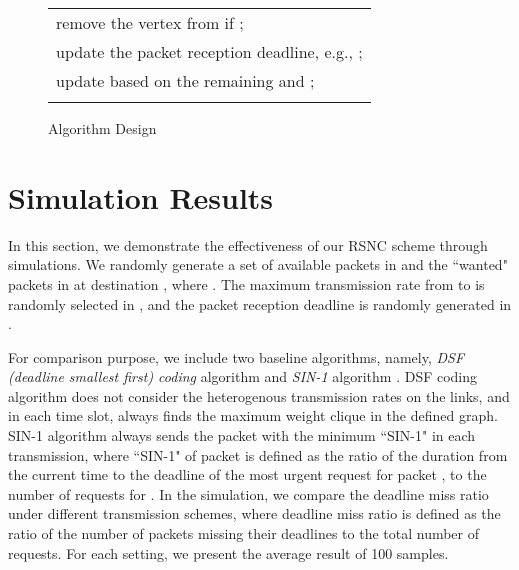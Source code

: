\documentclass[journal]{IEEEtran}
\begin{document}
\begin{figure}[t]
{\begin{tabular}{|l|}
\hspace{4mm} remove the vertex  from  if ;\\
\hspace{4mm} update the packet reception deadline, e.g., ;\\
\hspace{4mm} update  based on the remaining  and ;\\
\hspace{2mm}{\bf Endwhile}\\
\hline
\end{tabular}\vspace{-0.05in}
\caption{Algorithm Design}\vspace{-0.15in} \label{alg}}
\end{figure}

\vspace{-0.1in}
\section{Simulation Results}\label{Sec.simulation}\vspace{-0.02in}
In this section, we demonstrate the effectiveness of our RSNC scheme through simulations.
We randomly generate a set of available packets in  and the ``wanted" packets in  at destination , where . The maximum transmission rate from  to  is randomly selected in , and the packet reception deadline is randomly generated in .

For comparison purpose, we include two baseline algorithms,
namely, {\em DSF (deadline smallest first) coding} algorithm \cite{ZX2010Broadcast6} and {\em SIN-1} algorithm \cite{XTL2006Time-critical14}. DSF coding algorithm does not consider the heterogenous transmission rates on the links, and in each time slot, always finds the maximum weight clique in the defined graph. SIN-1 algorithm always sends the packet with the minimum ``SIN-1" in each transmission, where ``SIN-1" of packet  is defined as the ratio of the duration from the current time to the deadline of the most urgent request for packet , to the number of requests for . In the simulation, we compare the deadline miss ratio under different transmission schemes, where deadline miss ratio is defined as the ratio of the number of packets missing their deadlines to the total number of requests.
For each setting, we present the average result of 100 samples.

\vspace{-0.1in}
\end{document}

